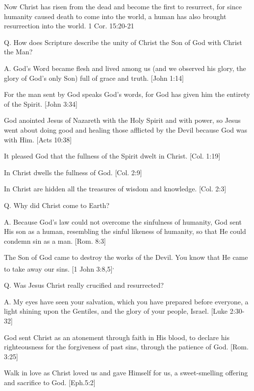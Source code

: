 \documentclass[../main.tex]{subfiles}
\begin{document}
Now Christ has risen from the dead and become the first to resurrect, for since humanity caused death to come into the world, a human has also brought resurrection into the world. {1 Cor. 15:20-21}

Q. How does Scripture describe the unity of Christ the Son of God with Christ the Man?

A. God's Word became flesh and lived among us (and we observed his glory, the glory of God's only Son) full of grace and truth. [John 1:14]

For the man sent by God speaks God's words, for God has given him the entirety of the Spirit. [John 3:34]

God anointed Jesus of Nazareth with the Holy Spirit and with power, so Jesus went about doing good and healing those afflicted by the Devil because God was with Him. [Acts 10:38]

It pleased God that the fullness of the Spirit dwelt in Christ. [Col. 1:19]

In Christ dwells the fullness of God. [Col. 2:9]

In Christ are hidden all the treasures of wisdom and knowledge. [Col. 2:3]

Q. Why did Christ come to Earth?

A. Because God's law could not overcome the sinfulness of humanity, God sent His son as a human, resembling the sinful likeness of humanity, so that He could condemn sin as a man. [Rom. 8:3]

The Son of God came to destroy the works of the Devil. You know that He came to take away our sins. [1 John 3:8,5]\textsuperscript{,}

Q. Was Jesus Christ really crucified and resurrected?

A. My eyes have seen your salvation, which you have prepared before everyone, a light shining upon the Gentiles, and the glory of your people, Israel. [Luke 2:30-32]

God sent Christ as an atonement through faith in His blood, to declare his righteousness for the forgiveness of past sins, through the patience of God. [Rom. 3:25]

Walk in love as Christ loved us and gave Himself for us, a sweet-smelling offering and sacrifice to God. [Eph.5:2]
\end{document}

